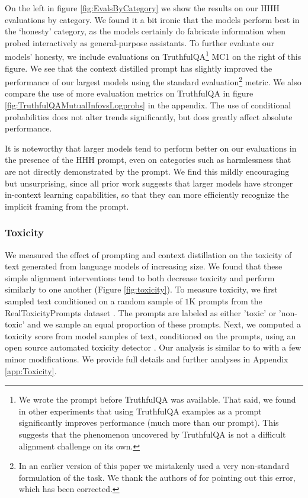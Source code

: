 On the left in figure \ref{fig:EvalsByCategory} we show the results on our HHH evaluations by category.  We found it  a bit ironic that the models perform best in the `honesty' category, as the models certainly do fabricate information when probed interactively as general-purpose assistants.  To further evaluate our models' honesty, we include evaluations on TruthfulQA\footnote{We wrote the prompt before TruthfulQA was available.  That said, we found in other experiments that using TruthfulQA examples as a prompt significantly improves performance (much more than our prompt).  This suggests that the phenomenon uncovered by TruthfulQA is not a difficult alignment challenge on its own.} MC1 on the right of this figure.  We see that the context distilled prompt has slightly improved the performance of our largest models using the standard evaluation\footnote{In an earlier version of this paper we mistakenly used a very non-standard formulation of the task.  We thank the authors of \cite{lin2021truthfulqa} for pointing out this error, which has been corrected.} metric.  We also compare the use of more evaluation metrics on TruthfulQA in figure \ref{fig:TruthfulQAMutualInfovsLogprobs} in the appendix.  The use of conditional probabilities does not alter trends significantly, but does greatly affect absolute performance.  

It is noteworthy that larger models tend to perform better on our evaluations in the presence of the  HHH prompt, even on categories such as harmlessness that are not directly demonstrated by the prompt.  We find this mildly encouraging but unsurprising, since all prior work suggests that larger models have stronger in-context learning capabilities, so that they can more efficiently recognize the implicit framing from the prompt. 

\subsubsection{Toxicity}

We measured the effect of prompting and context distillation on the toxicity of text generated from language models of increasing size. We found that these simple alignment interventions tend to both decrease toxicity and perform similarly to one another (Figure \ref{fig:toxicity}). To measure toxicity, we first sampled text conditioned on a random sample of $1$K prompts from the RealToxicityPrompts dataset \cite{gehman2020realtoxicityprompts}. The prompts are labeled as either 'toxic' or 'non-toxic' and we sample an equal proportion of these prompts. Next, we computed a toxicity score from model samples of text, conditioned on the prompts, using an open source automated toxicity detector \cite{Detoxify}. Our analysis is similar to to \cite{gehman2020realtoxicityprompts} with a few minor modifications. We provide full details and further analyses in Appendix \ref{app:Toxicity}. 


